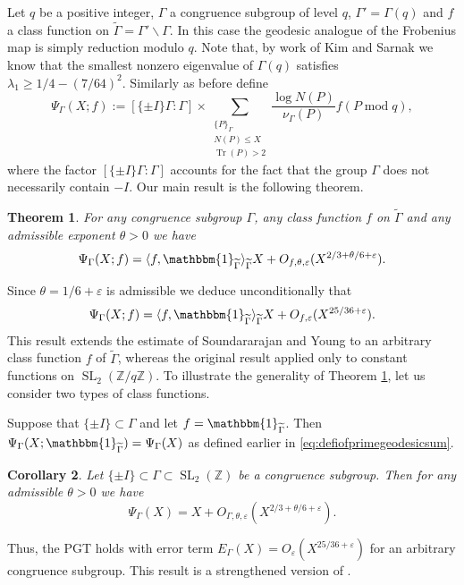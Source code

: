 \documentclass{article}
\newtheorem{thm}{Theorem}[section]
\newtheorem{cor}[thm]{Corollary}
\theoremstyle{named}
\newcommand{\Z}{\mathbb{Z}}
\DeclareMathOperator{\SL}{SL}
\DeclareMathOperator{\Tr}{Tr}
\DeclareMathOperator{\modulo}{mod}
\begin{document}
Let $q$ be a positive integer, $\Gamma$ a congruence subgroup of level $q$, $\Gamma' = \Gamma(q)$ and $f$ a class function on $\widetilde{\Gamma} = \Gamma'\backslash \Gamma$. In this case the geodesic analogue of the Frobenius map is simply reduction modulo $q$. Note that, by work of Kim and Sarnak \cite[second appendix]{kimramakrishnansarnak2003} we know that the smallest nonzero eigenvalue of $\Gamma(q)$ satisfies $\lambda_1 \geq 1/4 - (7/64)^2$. Similarly as before define 
\begin{equation}\label{eq:chebyshevsumsgeneral}
    \Psi_{\Gamma}(X; f) := [\{\pm I\}\Gamma: \Gamma] \times \sum_{\substack{\{P\}_\Gamma\\
    N(P) \leq X\\
    \Tr(P) > 2}} \frac{\log N(P)}{\nu_\Gamma(P)}f(P \modulo q),
\end{equation}
where the factor $[\{\pm I\}\Gamma: \Gamma]$ accounts for the fact that the group $\Gamma$ does not necessarily contain $-I$. Our main result is the following theorem.
\begin{thm}\label{thm:maintheorem1}
For any congruence subgroup $\Gamma$, any class function $f$ on $\widetilde{\Gamma}$ and any admissible exponent $\theta > 0$ we have
\begin{equation*}
    \Psi_\Gamma(X; f) = \langle f, \mathbbm{1}_{\widetilde{\Gamma}}\rangle_{\widetilde{\Gamma}} X + O_{f, \theta, \varepsilon}(X^{2/3 + \theta/6 + \varepsilon}).
\end{equation*}
\end{thm}
Since $\theta = 1/6 + \varepsilon$ is admissible we deduce unconditionally that
\begin{equation*}
    \Psi_{\Gamma}(X; f) = \langle f, \mathbbm{1}_{\widetilde{\Gamma}}\rangle_{\widetilde{\Gamma}} X + O_{f, \varepsilon}(X^{25/36 + \varepsilon}).
\end{equation*}
This result extends the estimate of Soundararajan and Young \cite[Theorem 1.1]{Soundararajan_2013} to an arbitrary class function $f$ of $\widetilde{\Gamma}$, whereas the original result applied only to constant functions on $\SL_2(\Z/q\Z)$. To illustrate the generality of Theorem \ref{thm:maintheorem1}, let us consider two types of class functions.

Suppose that $\{\pm I\} \subset \Gamma$ and let $f = \mathbbm{1}_{\widetilde{\Gamma}}$. Then $\Psi_{\Gamma}(X; \mathbbm{1}_{\widetilde{\Gamma}}) = \Psi_\Gamma(X)$ as defined earlier in \eqref{eq:defiofprimegeodesicsum}.
\begin{cor}\label{cor:pgtforanycongruencesubgroup}
Let $\{\pm I\} \subset \Gamma \subset \SL_2(\Z)$ be a congruence subgroup. Then for any admissible $\theta>0$ we have 
\begin{equation*}
    \Psi_\Gamma(X) = X + O_{\Gamma, \theta, \varepsilon}(X^{2/3 + \theta/6 + \varepsilon}).
\end{equation*}
\end{cor}
Thus, the PGT holds with error term $E_\Gamma(X) = O_{\varepsilon}(X^{25/36 + \varepsilon})$ for an arbitrary congruence subgroup. This result is a strengthened version of \cite[Corollary 1.2]{sarnakluorudnick1995}.
\end{document}
